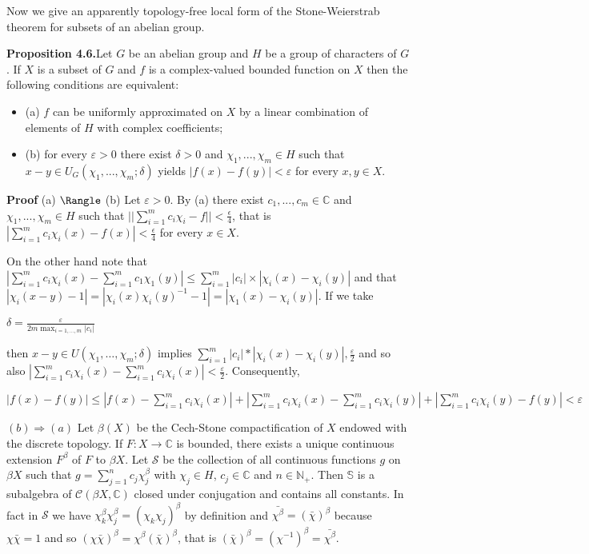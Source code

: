\documentclass[12pt]{article}
\begin{document}
    Now we give an apparently topology-free local form of the Stone-Weierstrab theorem for subsets of an abelian group.


\textbf{Proposition 4.6.}Let $G$ be an abelian group and $H$ be a group of characters of $G$. If $X$ is a subset of $G$ and $f$ is a complex-valued
bounded function on $X$ then the following conditions are equivalent:

    \begin{itemize}

        \item (a) $f$ can be uniformly approximated on $X$ by a linear combination of elements of $H$ with complex coefficients;

        \item (b) for every $\varepsilon > 0$ there exist $\delta > 0$ and $\chi_1,...,\chi_m \in H$ such that $x - y \in U_G (\chi_1,...,\chi_m; \delta)$ yields $|f (x) - f (y)| < \varepsilon$ for every
            $x, y \in X$.

    \end{itemize}

\textbf{Proof} (a) $\Rangle$ (b) Let $\varepsilon > 0$. By (a) there exist $c_1,...,c_m \in \mathbb{C}$ and $\chi_1,...,\chi_m \in H$ such that $|| \sum^{m}_{i=1} c_i \chi_i - f || < \frac{\epsilon}{4}$, that is
$|\sum^{m}_{i=1} c_i \chi_i (x) -f(x)| < \frac{\epsilon}{4}$ for every $x \in X$.


    On the other hand note that $|\sum^{m}_{i=1} c_i \chi_i (x) - \sum^{m}_{i=1} c_1 \chi_1 (y)| \leqslant \sum^{m}_{i=1} |c_i| \times |\chi_i (x) - \chi_i (y)|$ and that
    $|\chi_i (x-y)-1| = |\chi_i (x) \chi_i (y)^{-1}-1|=|\chi_1 (x) - \chi_i(y)|$. If we take


        $\delta = \frac{\varepsilon}{2m \max_{i=1,...,m} |c_i|}$


then $x - y \in U(\chi_1, \dots, \chi_m; \delta)$ implies $\sum^m_{i=1} |c_i| * |\chi_i (x) - \chi_i (y)| , \frac{\varepsilon}{2}$ and so also $|\sum^m_{i=1} c_i \chi_i (x) - \sum^m_{i=1} c_i \chi_i (x)| < \frac{\varepsilon}{2}$. 
Consequently,


    $|f(x) - f(y)| \leqslant |f(x) - \sum^m_{i=1} c_i \chi_i (x)| + |\sum^m_{i=1} c_i \chi_i (x) - \sum^m_{i=1} c_i \chi_i (y)| + |\sum^m_{i=1} c_i \chi_i (y) - f(y)| < \varepsilon$


$(b) \Longrightarrow (a)$ Let $\beta (X)$ be the Cech-Stone compactification of $X$ endowed with the discrete topology. If $F : X \to \mathbb{C}$ is bounded,
there exists a unique continuous extension $F^{\beta}$ of $F$ to $\beta X$. Let $\mathcal{S}$ be the collection of all continuous functions $g$ on $\beta X$
such that $g = \sum^n_{j=1} c_j \chi^\beta_j$ with $\chi_j \in H$, $c_j \in \mathbb{C}$ and $n \in \mathbb{N}_+$. Then $\mathbb{S}$ is a subalgebra of $\mathcal{C} (\beta X, \mathbb{C})$ closed under conjugation
and contains all constants. In fact in $\mathcal{S}$ we have $\chi_k^\beta \chi_j^\beta = (\chi_k \chi_j)^\beta$ by definition and $\bar{\chi^\beta} = (\bar{\chi})^\beta$ because $\chi \bar{\chi} = 1$ and so
$(\chi \bar{\chi})^\beta = \chi^\beta(\bar{\chi})^\beta$, that is $(\bar{\chi})^\beta = (\chi^{-1})^\beta = \bar{\chi^\beta} $.
\end{document}

